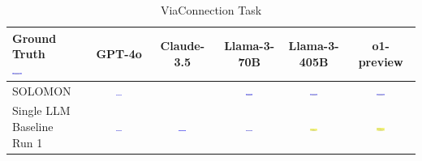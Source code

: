 \begin{table}
  \caption{ViaConnection Task}
  \label{table:viaconnection}
  \centering
  \begin{tabular}{@{}lccccc@{}}
    \toprule
    \makecell{Ground Truth \\ \includegraphics[width=0.13\textwidth]{examples_png/ViaConnection.png}} & GPT-4o & Claude-3.5 & Llama-3-70B & Llama-3-405B & o1-preview \\
    \midrule
    SOLOMON & \includegraphics[width=0.13\textwidth]{./pool_all/png/gpt-4o_results/ViaConnection.png} &  & \includegraphics[width=0.13\textwidth]{./pool_all/png/claude-3-5-sonnet-20240620_results/ViaConnection.png} & \includegraphics[width=0.13\textwidth]{./pool_all/png/watsonx_meta-llama_llama-3-1-70b-instruct_results/ViaConnection.png} & \includegraphics[width=0.13\textwidth]{./pool_all/png/watsonx_meta-llama_llama-3-405b-instruct_results/ViaConnection.png} \\
    \makecell{Single LLM \\ Baseline \\ Run 1} & \includegraphics[width=0.13\textwidth]{./run_1/png/gpt-4o_results/ViaConnection.png} & \includegraphics[width=0.13\textwidth]{./run_1/png/o1-preview_results/ViaConnection.png} & \includegraphics[width=0.13\textwidth]{./run_1/png/claude-3-5-sonnet-20240620_results/ViaConnection.png} & \includegraphics[width=0.13\textwidth]{./run_1/png/watsonx_meta-llama_llama-3-1-70b-instruct_results/ViaConnection.png} & \includegraphics[width=0.13\textwidth]{./run_1/png/watsonx_meta-llama_llama-3-405b-instruct_results/ViaConnection.png} \\

\end{tabular}
\end{table}
